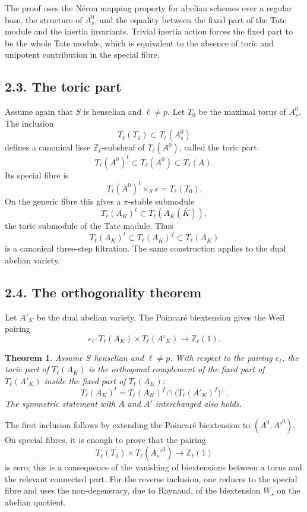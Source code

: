 \documentclass[11pt]{article}
\theoremstyle{plain}
\newtheorem{theorem}{Theorem}[section]
\theoremstyle{definition}
\theoremstyle{remark}
\newcommand{\bZ}{\mathbb Z}
\begin{document}
The proof uses the Néron mapping property for abelian schemes over a regular
base, the structure of \(A_s^0\), and the equality between the fixed part of the
Tate module and the inertia invariants. Trivial inertia action forces the fixed
part to be the whole Tate module, which is equivalent to the absence of toric and
unipotent contribution in the special fibre.

\subsection*{2.3. The toric part}

Assume again that \(S\) is henselian and \(\ell\neq p\). Let \(T_0\) be the
maximal torus of \(A_s^0\). The inclusion
\[
T_\ell(T_0)\subset T_\ell(A_s^0)
\]
defines a canonical lisse \(\bZ_\ell\)-subsheaf of \(T_\ell(A^0)\), called the
toric part:
\[
T_\ell(A^0)^t\subset T_\ell(A^0)\subset T_\ell(A).
\]
Its special fibre is
\[
T_\ell(A^0)^t\times_S s=T_\ell(T_0).
\]
On the generic fibre this gives a \(\pi\)-stable submodule
\[
T_\ell(A_K)^t\subset T_\ell(A_K(\overline K)),
\]
the toric submodule of the Tate module. Thus
\[
T_\ell(A_K)^t\subset T_\ell(A_K)^f\subset T_\ell(A_K)
\]
is a canonical three-step filtration. The same construction applies to the dual
abelian variety.

\subsection*{2.4. The orthogonality theorem}

Let \(A'_K\) be the dual abelian variety. The Poincaré biextension gives the
Weil pairing
\[
e_\ell:T_\ell(A_K)\times T_\ell(A'_K)\longrightarrow \bZ_\ell(1).
\]

\begin{theorem}
Assume \(S\) henselian and \(\ell\neq p\). With respect to the pairing
\(e_\ell\), the toric part of \(T_\ell(A_K)\) is the orthogonal complement of
the fixed part of \(T_\ell(A'_K)\) inside the fixed part of \(T_\ell(A_K)\):
\[
T_\ell(A_K)^t
=
T_\ell(A_K)^f\cap\bigl(T_\ell(A'_K)^f\bigr)^\perp.
\]
The symmetric statement with \(A\) and \(A'\) interchanged also holds.
\end{theorem}

The first inclusion follows by extending the Poincaré biextension to
\((A^0,A'^0)\). On special fibres, it is enough to prove that the pairing
\[
T_\ell(T_0)\times T_\ell(A_s'^0)\to \bZ_\ell(1)
\]
is zero; this is a consequence of the vanishing of biextensions between a torus
and the relevant connected part. For the reverse inclusion, one reduces to the
special fibre and uses the non-degeneracy, due to Raynaud, of the biextension
\(W_s\) on the abelian quotient.
\end{document}

